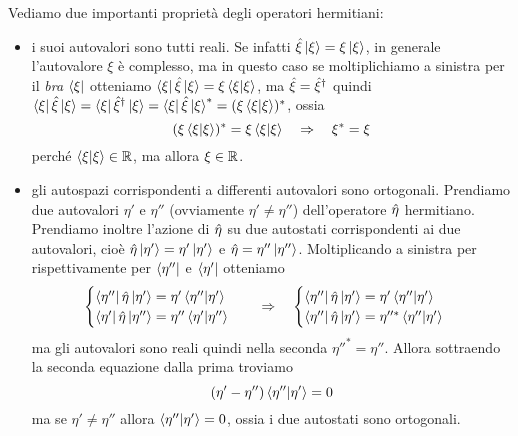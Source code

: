 Vediamo due importanti proprietà degli operatori hermitiani:
\begin{itemize}
	\item i suoi autovalori sono tutti reali.
		Se infatti $\hat{\xi}\left|{\xi}\right\rangle=\xi\left|{\xi}\right\rangle$, in generale l'autovalore $\xi$ è complesso, ma in questo caso se moltiplichiamo a sinistra per il \emph{bra} $\left\langle{\xi}\right|$ otteniamo $\left\langle{\xi}\right|\hat{\xi}\left|{\xi}\right\rangle=\xi\left\langle{\xi}\middle|{\xi}\right\rangle$, ma $\hat{\xi}={\hat{\xi}}^\dagger$ quindi $\left\langle{\xi}\right|\hat{\xi}\left|{\xi}\right\rangle=\left\langle{\xi}\right|{\hat{\xi}}^\dagger\left|{\xi}\right\rangle=\left\langle{\xi}\right|\hat{\xi}\left|{\xi}\right\rangle^*=(\xi\left\langle{\xi}\middle|{\xi}\right\rangle)^*$, ossia
		\begin{equation}
			(\xi\left\langle{\xi}\middle|{\xi}\right\rangle)^*=\xi\left\langle{\xi}\middle|{\xi}\right\rangle\quad\Rightarrow\quad\xi^*=\xi
		\end{equation}
		perch\'e $\left\langle{\xi}\middle|{\xi}\right\rangle\in\mathbb{R}$, ma allora $\xi\in\mathbb{R}$.
	\item gli autospazi corrispondenti a differenti autovalori sono ortogonali.
		Prendiamo due autovalori $\eta'$ e $\eta''$ (ovviamente $\eta'\neq\eta''$) dell'operatore $\hat{\eta}$ hermitiano.
		Prendiamo inoltre l'azione di $\hat{\eta}$ su due autostati corrispondenti ai due autovalori, cioè $\hat{\eta}\left|{\eta'}\right\rangle=\eta'\left|{\eta'}\right\rangle$ e $\hat{\eta}=\eta''\left|{\eta''}\right\rangle$.
		Moltiplicando a sinistra per rispettivamente per $\left\langle{\eta''}\right|$ e $\left\langle{\eta'}\right|$ otteniamo
		\begin{equation}
			\begin{cases}
				\left\langle{\eta''}\right|\hat{\eta}\left|{\eta'}\right\rangle=\eta'\left\langle{\eta''}\middle|{\eta'}\right\rangle\\
				\left\langle{\eta'}\right|\hat{\eta}\left|{\eta''}\right\rangle=\eta''\left\langle{\eta'}\middle|{\eta''}\right\rangle
			\end{cases}
			\quad\Rightarrow\quad
			\begin{cases}
				\left\langle{\eta''}\right|\hat{\eta}\left|{\eta'}\right\rangle=\eta'\left\langle{\eta''}\middle|{\eta'}\right\rangle\\
				\left\langle{\eta''}\right|\hat{\eta}\left|{\eta'}\right\rangle=\eta''^*\left\langle{\eta''}\middle|{\eta'}\right\rangle
			\end{cases}
		\end{equation}
		ma gli autovalori sono reali quindi nella seconda $\eta''^*=\eta''$.
		Allora sottraendo la seconda equazione dalla prima troviamo
		\begin{equation}
			(\eta'-\eta'')\left\langle{\eta''}\middle|{\eta'}\right\rangle=0
		\end{equation}
		ma se $\eta'\neq\eta''$ allora $\left\langle{\eta''}\middle|{\eta'}\right\rangle=0$, ossia i due autostati sono ortogonali.
\end{itemize}

